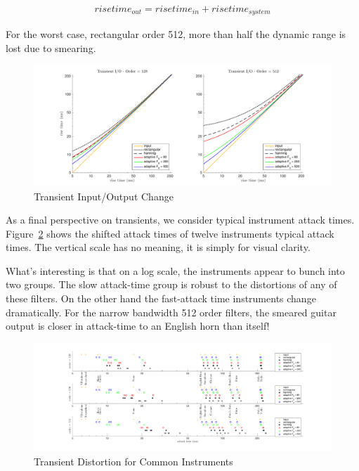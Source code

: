 \documentclass [11pt, proquest,oneside] {ganter_thesis}[2015/03/03]
\begin{document}
\begin{align}
risetime_{out} = risetime_{in} + risetime_{system}
\end{align}

For the worst case, rectangular order 512, more than half the dynamic range is lost due to smearing.

\begin{figure}[!ht]
  \centering
    \includegraphics[width=1\textwidth]{transient_2}
    \caption{Transient Input/Output Change}\label{fig:transient_2}
\end{figure}

As a final perspective on transients, we consider typical instrument attack times.  Figure~\ref{fig:transient_3} shows the shifted attack times of twelve instruments typical attack times.  The vertical scale has no meaning, it is simply for visual clarity.

What's interesting is that on a log scale, the instruments appear to bunch into two groups.  The slow attack-time group is robust to the distortions of any of these filters.  On the other hand the fast-attack time instruments change dramatically.  For the narrow bandwidth 512 order filters, the smeared guitar output is closer in attack-time to an English horn than itself!

\begin{figure}[!ht]
  \centering
    \includegraphics[width=1\textwidth]{transient_3}
    \caption{Transient Distortion for Common Instruments}\label{fig:transient_3}
\end{figure}
\end{document}
